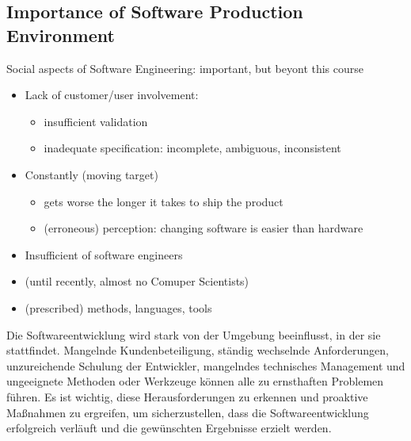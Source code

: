 \subsection{Importance of Software Production Environment}
\begin{defBox}
    Social aspects of Software Engineering: important, but beyont this course
\end{defBox}
\begin{defBox}[title=Software Development Problems caused by Environment]
    \begin{itemize}
        \item Lack of customer/user involvement:
        \begin{itemize}
            \item insufficient validation
            \item inadequate specification: incomplete, ambiguous, inconsistent
        \end{itemize}
        \item Constantly  (moving target)
        \begin{itemize}
            \item gets worse the longer it takes to ship the product
            \item (erroneous) perception: changing software is easier than hardware
        \end{itemize}
        \item Insufficient  of software engineers
        \item {} (until recently, almost no Comuper Scientists)
        \item {} (prescribed) methods, languages, tools
    \end{itemize}
\end{defBox}
\begin{infoBox}
    Die Softwareentwicklung wird stark von der Umgebung beeinflusst, in der sie stattfindet. Mangelnde Kundenbeteiligung, ständig wechselnde Anforderungen, unzureichende Schulung der Entwickler, mangelndes technisches Management und ungeeignete Methoden oder Werkzeuge können alle zu ernsthaften Problemen führen. Es ist wichtig, diese Herausforderungen zu erkennen und proaktive Maßnahmen zu ergreifen, um sicherzustellen, dass die Softwareentwicklung erfolgreich verläuft und die gewünschten Ergebnisse erzielt werden.
\end{infoBox}
